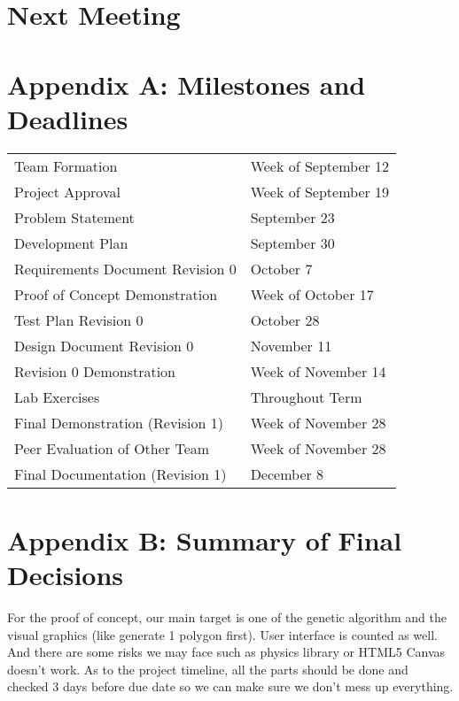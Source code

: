 \documentclass[11pt]{meetingmins}
\begin{document}
\section{Next Meeting}
	\vspace{1em}

\newpage
\section{Appendix A: Milestones and Deadlines}
\begin{tabular}{ p{6.7cm} l}

  Team Formation & Week of September 12\\

  Project Approval & Week of September 19\\

  Problem Statement & September 23\\

  Development Plan & September 30\\

  Requirements Document Revision 0 & October 7\\

  Proof of Concept Demonstration & Week of October 17\\

  Test Plan Revision 0 & October 28\\

  Design Document Revision 0 & November 11\\

  Revision 0 Demonstration & Week of November 14\\

  Lab Exercises & Throughout Term\\

  Final Demonstration (Revision 1) & Week of November 28\\

  Peer Evaluation of Other Team & Week of November 28\\

  Final Documentation (Revision 1) & December 8\\

\end{tabular}

\newpage
\section{Appendix B: Summary of Final Decisions}
	For the proof of concept, our main target is one of the genetic algorithm and 
the visual graphics (like generate 1 polygon first). User interface is counted 
as well. And there are some risks we may face such as physics library or HTML5 
Canvas doesn't work. As to the project timeline, all the parts should be done 
and checked 3 days before due date so we can make sure we don't mess up 
everything.
\end{document}
